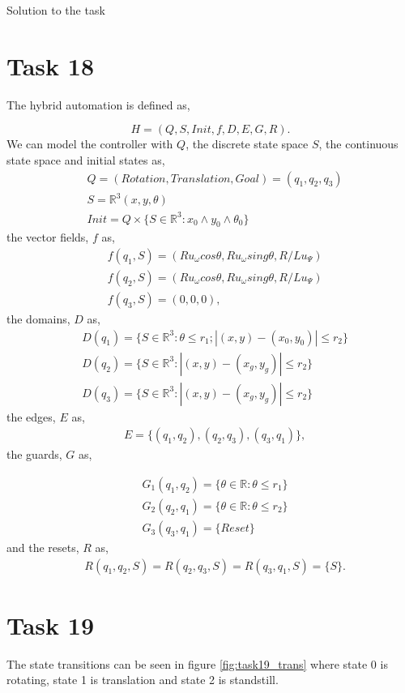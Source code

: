 \documentclass[a4paper,12pt,oneside,onecolumn]{article} %
\begin{document}
Solution to the task

\section*{Task 18}

The hybrid automation is defined as,

\begin{equation}
    H = (Q,S,Init,f,D,E,G,R).
\end{equation}
We can model the controller with $Q$, the discrete state space $S$,
the continuous state space and initial states as,
\begin{align*}
    &Q=(Rotation,Translation,Goal)=(q_1,q_2,q_3) \\
    &S=\mathbb{R}^3 (x,y,\theta)\\
    &Init = Q \times \{ S \in \mathbb{R}^3 :x_0\wedge y_0 \wedge
    \theta_0\}
\end{align*} 
the vector fields, $f$ as,
\begin{align*}
    &f(q_1,S)=(Ru_{\omega}cos\theta,Ru_{\omega}sing\theta,R/Lu_{\Psi}) \\
    &f(q_2,S)=(Ru_{\omega}cos\theta,Ru_{\omega}sing\theta,R/Lu_{\Psi})\\
    &f(q_3,S)=(0,0,0),
\end{align*}
the domains, $D$ as,
\begin{align*}
    &D(q_1)=\{S\in \mathbb{R}^3:\theta \le r_1; |(x,y)-(x_0,y_0)|\le r_2\} \\
    &D(q_2)=\{S\in \mathbb{R}^3:|(x,y)-(x_g,y_g)| \le r_2\} \\
    &D(q_3)=\{S\in \mathbb{R}^3:|(x,y)-(x_g,y_g)| \le r_2\}
\end{align*}
the edges, $E$ as,
\begin{align*}
    &E = \{(q_1,q_2), (q_2,q_3), (q_3, q_1)\},
\end{align*}
the guards, $G$ as,

\begin{align*}
    &G_1(q_1,q_2)=\{\theta\in\mathbb{R}:\theta\le r_1\} \\
    &G_2(q_2,q_1)=\{\theta\in\mathbb{R}:\theta\le r_2\} \\
    &G_3(q_3,q_1)=\{Reset\}
\end{align*}
and the resets, $R$ as,
\begin{align*}
  &R(q_1,q_2,S)=R(q_2,q_3,S)=R(q_3,q_1,S)=\{S\}.
\end{align*}


\section*{Task 19}
  The state transitions can be seen in figure \ref{fig:task19_trans}
  where state 0 is rotating, state 1 is translation and state 2 is
  standstill. 
\end{document}
